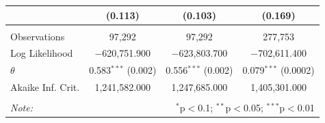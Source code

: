 \documentclass[12pt, letterpaper]{article}
\begin{document}
\begin{table}
{\begin{tabular}{@{\extracolsep{5pt}}lccc}
  & (0.113) & (0.103) & (0.169) \\ 
 \hline \\[-1.8ex] 
Observations & 97,292 & 97,292 & 277,753 \\ 
Log Likelihood & $-$620,751.900 & $-$623,803.700 & $-$702,611.400 \\ 
$\theta$ & 0.583$^{***}$  (0.002) & 0.556$^{***}$  (0.002) & 0.079$^{***}$  (0.0002) \\ 
Akaike Inf. Crit. & 1,241,582.000 & 1,247,685.000 & 1,405,301.000 \\ 
\hline 
\hline \\[-1.8ex] 
\textit{Note:}  & \multicolumn{3}{r}{$^{*}$p$<$0.1; $^{**}$p$<$0.05; $^{***}$p$<$0.01} \\ 
\end{tabular}}
\end{table}

\newpage
\end{document}
